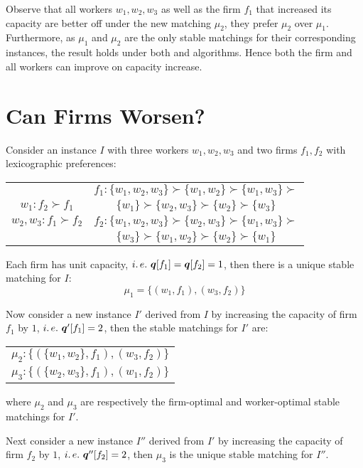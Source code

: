 Observe that all workers $w_1, w_2, w_3$ as well as the firm $f_1$ that increased its capacity are better off under the new matching $\mu_2$, \ie they prefer $\mu_2$ over $\mu_1$. Furthermore, as $\mu_1$ and $\mu_2$ are the only stable matchings for their corresponding instances, the result holds under both \WPDA and \FPDA algorithms. Hence both the firm and all workers can improve on capacity increase.

\section{Can Firms Worsen?}

\begin{example}
  \label{eg:firms-worsen}
  Consider an instance $I$ with three workers $w_1, w_2, w_3$ and two firms $f_1, f_2$ with lexicographic preferences:
  \begin{center}
    \begin{tabular}{c|c}

                                & $f_1: \{w_1, w_2, w_3\} \succ \{w_1, w_2\} \succ \{w_1, w_3\} \succ$ \\
      $w_1: f_2 \succ f_1$      & $\{w_1\} \succ \{w_2, w_3\} \succ \{w_2\} \succ \{w_3\}$             \\
      $w_2, w_3: f_1 \succ f_2$ & $f_2: \{w_1, w_2, w_3\} \succ \{w_2, w_3\} \succ \{w_1, w_3\} \succ$ \\
                                & $\{w_3\} \succ \{w_1, w_2\} \succ \{w_2\} \succ \{w_1\}$
    \end{tabular}
  \end{center}
  Each firm has unit capacity, $i.\,e.\  \boldsymbol{q}[f_1] = \boldsymbol{q}[f_2] = 1$, then there is a unique stable matching for $I$:
  $$\mu_1 = \{ (w_1, f_1), (w_3, f_2) \}$$

  Now consider a new instance $I'$ derived from $I$ by increasing the capacity of firm $f_1$ by $1$, $i.\,e.\  \boldsymbol{q}'[f_1] = 2$, then the stable matchings for $I'$ are:
  \begin{center}
    \begin{tabular}{c}
      $\mu_2: \{ (\{w_1, w_2\}, f_1), (w_3, f_2) \}$ \\
      $\mu_3: \{ (\{w_2, w_3\}, f_1), (w_1, f_2) \}$
    \end{tabular}
  \end{center}
  where $\mu_2$ and $\mu_3$ are respectively the firm-optimal and worker-optimal stable matchings for $I'$.

  Next consider a new instance $I''$ derived from $I'$ by increasing the capacity of firm $f_2$ by $1$, $i.\,e.\  \boldsymbol{q}''[f_2] = 2$, then $\mu_3$ is the unique stable matching for $I''$.
\end{example}

